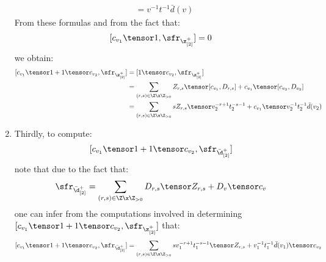 \begin{enumerate}
$$\begin{aligned}
                                        & = v^{-1} t^{-1} \bar{d}(v)
                                    \end{aligned}
                                $$
                            From these formulas and from the fact that:
                                $$[c_{v_1} \tensor 1, \sfr_{\z_{[2]}^+}] = 0$$
                            we obtain:
                                $$
                                    \begin{aligned}
                                         [c_{v_1} \tensor 1 + 1 \tensor c_{v_2}, \sfr_{\z_{[2]}^+}] & = [1 \tensor c_{v_2}, \sfr_{\z_{[2]}^+}]
                                         \\
                                         & = \sum_{(r, s) \in \Z \x \Z_{> 0}} Z_{r, s} \tensor [c_{v_1}, D_{r, s}] + c_{v_1} \tensor [c_{v_2}, D_{v_2}]
                                         \\
                                         & = \sum_{(r, s) \in \Z \x \Z_{> 0}} s Z_{r, s} \tensor v_2^{-r + 1} t_2^{-s - 1} + c_{v_1} \tensor v_2^{-1} t_2^{-1} \bar{d}(v_2)
                                    \end{aligned}
                                $$
                            \item Thirdly, to compute:
                                $$[c_{v_1} \tensor 1 + 1 \tensor c_{v_2}, \sfr_{\bar{\d}_{[2]}^+}]$$
                            note that due to the fact that:
                                $$\sfr_{ \bar{\d}_{[2]}^+ } = \sum_{(r, s) \in \Z \x \Z_{> 0}} D_{r, s} \tensor Z_{r, s} + D_v \tensor c_v$$
                            one can infer from the computations involved in determining $[c_{v_1} \tensor 1 + 1 \tensor c_{v_2}, \sfr_{\z_{[2]}^+}]$ that:
                                $$[c_{v_1} \tensor 1 + 1 \tensor c_{v_2}, \sfr_{\bar{\d}_{[2]}^+}] = \sum_{(r, s) \in \Z \x \Z_{> 0}} s v_1^{-r + 1} t_1^{-s - 1} \tensor Z_{r, s} + v_1^{-1} t_1^{-1} \bar{d}(v_1) \tensor c_{v_2}$$
                        \end{enumerate}
                        

